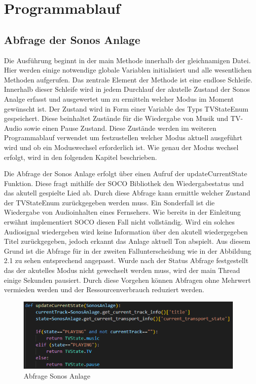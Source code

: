\chapter{Programmablauf}
\section{Abfrage der Sonos Anlage}
Die Ausführung beginnt in der main Methode innerhalb der gleichnamigen Datei. Hier werden einige notwendige globale Variablen initialisiert und alle wesentlichen Methoden
aufgerufen. Das zentrale Element der Methode ist eine endlose Schleife. Innerhalb dieser Schleife wird in jedem Durchlauf der akutelle Zustand der Sonos Analge erfasst 
und ausgewertet um zu ermitteln welcher Modus im Moment gewünscht ist. Der Zustand wird in Form einer Variable des Typs TVStateEnum gespeichert. 
Diese beinhaltet Zustände für die Wiedergabe von Musik und TV-Audio sowie einen Pause Zustand. Diese Zustände werden im weiteren Programmablauf verwendet um festzustellen
welcher Modus aktuell ausgeführt wird und ob ein Moduswechsel erforderlich ist. Wie genau der Modus wechsel erfolgt, wird in den folgenden Kapitel beschrieben.

Die Abfrage der Sonos Anlage erfolgt über einen Aufruf der updateCurrentState Funktion. Diese fragt mithilfe der SOCO Bibliothek den Wiedergabestatus und
das akutell gespielte Lied ab. Durch diese Abfrage kann ermittle welcher Zustand der TVStateEnum zurückgegeben werden muss. 
Ein Sonderfall ist die Wiedergabe von Audioinhalten eines Fernsehers. Wie bereits in der Einleitung erwähnt implementiert SOCO diesen Fall nicht vollständig.
Wird ein solches Audiosignal wiedergeben wird keine Information über den akutell wiedergegeben Titel zurückgegeben, jedoch erkannt das Anlage aktuell Ton abspielt. 
Aus diesem Grund ist die Abfrage für in der zweiten Fallunterscheidung wie in der Abbildung 2.1 zu sehen entsprechend angepasst. Wurde nach der Status Abfrage
festgestellt das der akutelles Modus nicht gewechselt werden muss, wird der main Thread einige Sekunden pausiert. Durch diese Vorgehen können Abfragen ohne Mehrwert vermieden werden
und der Ressourcenverbrauch reduziert werden. 

\begin{figure}[ht]
    \centering
    \includegraphics[scale=0.5]{UpdateCurrentState.png}
    \caption{Abfrage Sonos Anlage}
    \label{UpdateCurrentState}
\end{figure}

